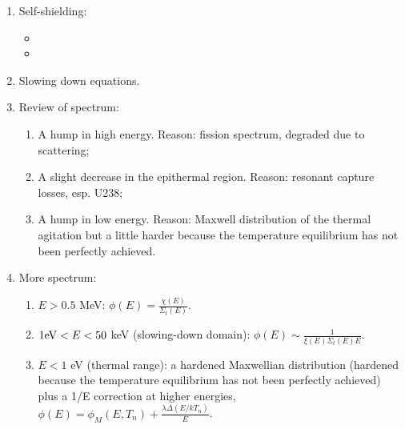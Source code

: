 \documentclass{school-22.211-notes}
\begin{document}
\begin{enumerate}
\item Self-shielding: 
  \begin{itemize}
    \item 
    \item 
  \end{itemize}
\item Slowing down equations. 
\item Review of spectrum:
    \begin{enumerate}
      \item A hump in high energy. Reason: fission spectrum, degraded due to scattering; 
      \item A slight decrease in the epithermal region. Reason: resonant capture losses, esp. U238; 
      \item A hump in low energy. Reason: Maxwell distribution of the thermal agitation but a little harder because the temperature equilibrium has not been perfectly achieved. 
    \end{enumerate}
\item More spectrum: 
  \begin{enumerate}
  \item $E > 0.5$ MeV: $\phi(E) = \frac{\chi(E)}{\Sigma_t(E)}$.
  \item $1 \mathrm{eV} < E < 50$ keV (slowing-down domain): $\phi(E) \sim \frac{1}{\xi(E) \Sigma_t(E) E}$. 
  \item $E < 1$ eV (thermal range): a hardened Maxwellian distribution (hardened because the temperature equilibrium has not been perfectly achieved) plus a 1/E correction at higher energies, $\phi(E) = \phi_M (E, T_n) + \frac{ \lambda \Delta (E/kT_n) }{E}$. 
  \end{enumerate}
\end{enumerate}
\end{document}
